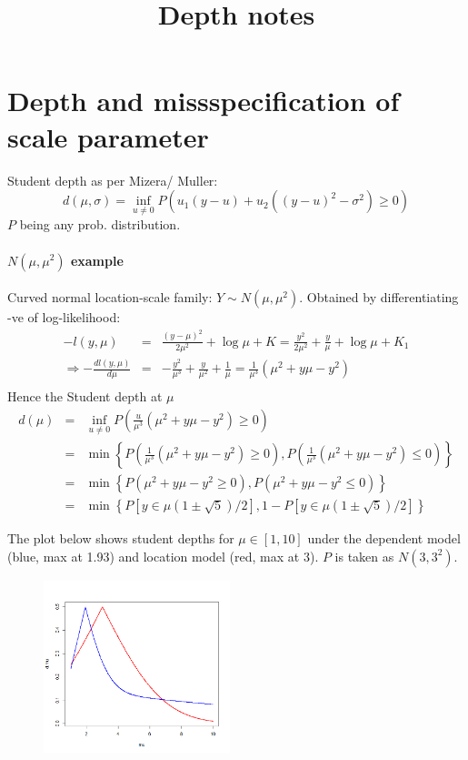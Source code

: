 \documentclass[10pt]{article}
\begin{document}
\title{Depth notes}\maketitle

\section{Depth and missspecification of scale parameter}

Student depth as per Mizera/ Muller:
$$ d(\mu,\sigma) = \inf_{u\neq 0} P(u_1(y-u) + u_2((y-u)^2-\sigma^2) \geq 0) $$
$P$ being any prob. distribution.
\paragraph{$N(\mu,\mu^2)$ example}
Curved normal location-scale family: $Y \sim N(\mu,\mu^2)$. Obtained by differentiating -ve of log-likelihood:
\begin{eqnarray*}
-l(y,\mu) &=& \frac{(y-\mu)^2}{2\mu^2} + \log\mu + K = \frac{y^2}{2\mu^2} + \frac{y}{\mu} +\log\mu + K_1\\
\Rightarrow -\frac{dl(y,\mu)}{d\mu} &=& -\frac{y^2}{\mu^3} + \frac{y}{\mu^2} + \frac{1}{\mu}
= \frac{1}{\mu^3}(\mu^2+y\mu - y^2)\\
\end{eqnarray*}
Hence the Student depth at $\mu$
\begin{eqnarray*}
d(\mu) &=& \inf_{u\neq 0} P\left( \frac{u}{\mu^3}(\mu^2+y\mu - y^2) \geq 0\right)\\
&=& \min\left\lbrace P\left( \frac{1}{\mu^3}(\mu^2+y\mu - y^2) \geq 0\right), P\left( \frac{1}{\mu^3}(\mu^2+y\mu - y^2) \leq 0\right) \right\rbrace \\
&=& \min\left\lbrace P\left( \mu^2+y\mu - y^2 \geq 0\right), P\left(\mu^2+y\mu - y^2 \leq 0\right) \right\rbrace\\
&=& \min\left\lbrace P\left[y\in \mu(1\pm \sqrt 5)/2\right],1-P\left[y\in \mu(1\pm \sqrt 5)/2\right] \right\rbrace
\end{eqnarray*}

The plot below shows student depths for $\mu\in [1,10]$ under the dependent model (blue, max at 1.93) and location model (red, max at 3). $P$ is taken as $N(3,3^2)$.
\begin{figure}[h]\begin{center}
   \includegraphics[height=5cm]{depth1.png}
   \label{fig:fig1}
\end{center}
\end{figure}
\end{document}
